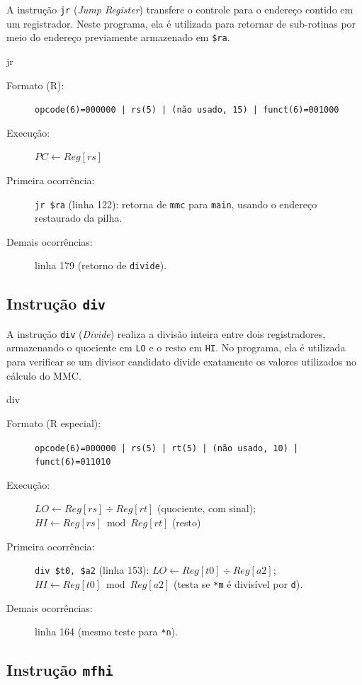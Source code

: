 A instrução \texttt{jr} (\textit{Jump Register}) transfere o controle para o
endereço contido em um registrador. Neste programa, ela é utilizada para
retornar de sub-rotinas por meio do endereço previamente armazenado em
\texttt{\$ra}.

\begin{instrucao}{jr}
\begin{description}
\item[Formato (R):] \texttt{opcode(6)=000000 | rs(5) | (não usado, 15) | funct(6)=001000}
\item[Execução:] $PC \leftarrow Reg[rs]$
\item[Primeira ocorrência:] \texttt{jr \$ra} (linha 122): retorna de
\texttt{mmc} para \texttt{main}, usando o endereço restaurado da pilha.
\item[Demais ocorrências:] linha 179 (retorno de \texttt{divide}).
\end{description}
\end{instrucao}

\subsection{Instrução \texttt{div}}

A instrução \texttt{div} (\textit{Divide}) realiza a divisão inteira entre
dois registradores, armazenando o quociente em \texttt{LO} e o resto em
\texttt{HI}. No programa, ela é utilizada para verificar se um divisor
candidato divide exatamente os valores utilizados no cálculo do MMC.

\begin{instrucao}{div}
\begin{description}
\item[Formato (R especial):] \texttt{opcode(6)=000000 | rs(5) | rt(5) | (não usado, 10) | funct(6)=011010}
\item[Execução:] $LO \leftarrow Reg[rs] \div Reg[rt]$
(quociente, com sinal);
$HI \leftarrow Reg[rs] \bmod Reg[rt]$
(resto)
\item[Primeira ocorrência:] \texttt{div \$t0, \$a2} (linha 153):
$LO \leftarrow Reg[t0] \div Reg[a2]$;
$HI \leftarrow Reg[t0] \bmod Reg[a2]$
(testa se \texttt{*m} é divisível por \texttt{d}).
\item[Demais ocorrências:] linha 164 (mesmo teste para \texttt{*n}).
\end{description}
\end{instrucao}

\subsection{Instrução \texttt{mfhi}}

